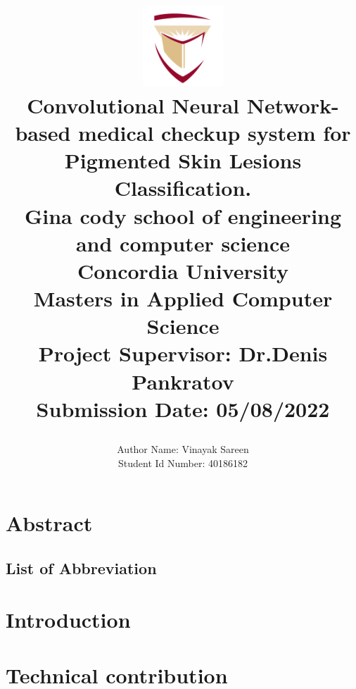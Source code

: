 \documentclass[]{report}
\title{
	\begin{center}
	\includegraphics[width=3cm]{assets/concordia-logo.png} \\
	\vspace{2mm}
	{Convolutional Neural Network-based medical checkup system for Pigmented Skin Lesions Classification.} \\
	\vspace{5mm} %
	\large {
		{Gina cody school of engineering and computer science}\\
		{Concordia University}\\
	}
	\vspace{3mm} %
	\textbf{ Masters in Applied Computer Science}\\
	{\large Project Supervisor: Dr.Denis Pankratov}\\
	{\large Submission Date: 05/08/2022} \\
	\end{center}
}
\author{
	{\large Author Name:  Vinayak Sareen} \\
	{\large Student Id Number:  40186182} \\
}
\date{}
\begin{document}
\maketitle

\chapter*{Abstract}


\pagebreak
\section*{List of Abbreviation}


\tableofcontents
\onehalfspacing
\chapter{Introduction}


% 

\chapter{Technical contribution}





\pagebreak
\thispagestyle{plain}
\end{document}
